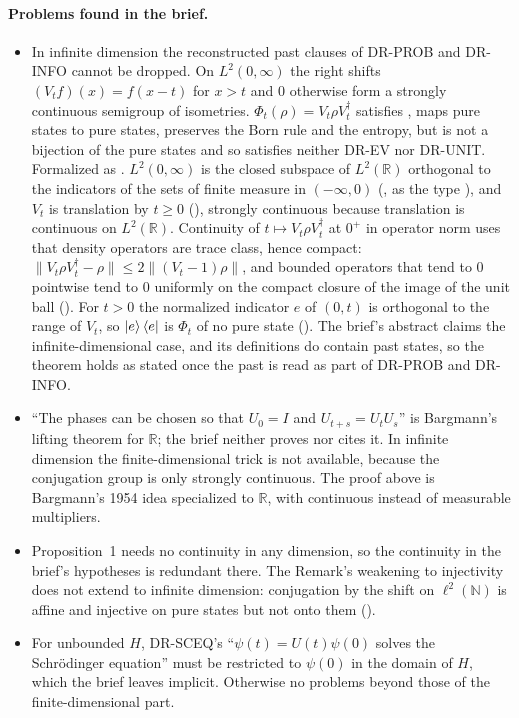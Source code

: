 \documentclass[11pt]{article}
\begin{document}
\paragraph{Problems found in the brief.}
\begin{itemize}
\item In infinite dimension the reconstructed past clauses of DR-PROB and DR-INFO cannot be
  dropped. On $L^2(0,\infty)$ the right shifts $(V_tf)(x) = f(x-t)$ for $x > t$ and $0$ otherwise
  form a strongly continuous semigroup of isometries. $\Phi_t(\rho) = V_t\rho V_t^\dagger$
  satisfies , maps pure states to pure states, preserves the Born rule and the
  entropy, but is not a bijection of the pure states and so satisfies neither DR-EV nor DR-UNIT.
  Formalized as . $L^2(0,\infty)$ is the closed subspace
  of $L^2(\mathbb{R})$ orthogonal to the indicators of the sets of finite measure in
  $(-\infty,0)$ (, as the type ), and $V_t$ is translation by
  $t \ge 0$ (), strongly continuous because translation is continuous on
  $L^2(\mathbb{R})$. Continuity of $t \mapsto V_t\rho V_t^\dagger$ at $0^+$ in operator norm uses
  that density operators are trace class, hence compact:
  $\|V_t\rho V_t^\dagger - \rho\| \le 2\|(V_t - 1)\rho\|$, and bounded operators that tend to $0$
  pointwise tend to $0$ uniformly on the compact closure of the image of the unit ball
  (). For $t > 0$ the normalized indicator $e$ of
  $(0,t)$ is orthogonal to the range of $V_t$, so $\ket{e}\bra{e}$ is $\Phi_t$ of no pure state
  ().
  The brief's abstract claims the infinite-dimensional case, and its definitions do contain past
  states, so the theorem holds as stated once the past is read as part of DR-PROB and DR-INFO.
\item ``The phases can be chosen so that $U_0 = I$ and $U_{t+s} = U_tU_s$'' is Bargmann's lifting
  theorem for $\mathbb{R}$; the brief neither proves nor cites it. In infinite dimension the
  finite-dimensional trick is not available, because the conjugation group is only strongly
  continuous. The proof above is Bargmann's 1954 idea specialized to $\mathbb{R}$, with continuous
  instead of measurable multipliers.
\item Proposition~1 needs no continuity in any dimension, so the continuity in the brief's
  hypotheses is redundant there. The Remark's weakening to injectivity does not extend to infinite
  dimension: conjugation by the shift on $\ell^2(\mathbb{N})$ is affine and injective on pure
  states but not onto them ().
\item For unbounded $H$, DR-SCEQ's ``$\psi(t) = U(t)\psi(0)$ solves the Schr\"odinger equation''
  must be restricted to $\psi(0)$ in the domain of $H$, which the brief leaves implicit. Otherwise
  no problems beyond those of the finite-dimensional part.
\end{itemize}
\end{document}
